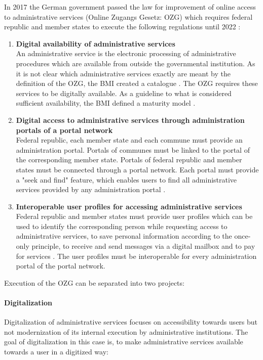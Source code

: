 In 2017 the German government passed the law for improvement of online access to administrative services (Online Zugangs Gesetz: OZG) which requires federal republic and member states to execute the following regulations until 2022 \cite{BMI:OZG_Wortlaut}:
\begin{enumerate}
    \item \textbf{Digital availability of administrative services} \\
    An administrative service is the electronic processing of administrative procedures which are available from outside the governmental institution.  As it is not clear which administrative services exactly are meant by the definition of the OZG, the BMI created a catalogue \cite{BMI:Verwaltungsleistungen}. The OZG requires these services to be digitally available. As a guideline to what is considered sufficient availability, the BMI defined a maturity model \cite{BMI:Digitale_Services}.
    \item \textbf{Digital access to administrative services through administration portals of a portal network} \\
    Federal republic, each member state and each commune must provide an administration portal. Portals of communes must be linked to the portal of the corresponding member state. Portals of federal republic and member states must be connected through a portal network. \cite{BMI:Portalverbund} Each portal must provide a "seek and find" feature, which enables users to find all administrative services provided by any administration portal \cite{Cotar:Drucksache_19/19089}. 
    \item \textbf{Interoperable user profiles for accessing administrative services} \\
    Federal republic and member states must provide user profiles which can be used to identify the corresponding person while requesting access to administrative services, to save personal information according to the once-only principle, to receive and send messages via a digital mailbox and to pay for services \cite{Cotar:Drucksache_19/19089}. The user profiles must be interoperable for every administration portal of the portal network.
\end{enumerate}

Execution of the OZG can be separated into two projects:

\paragraph{Digitalization}
Digitalization of administrative services focuses on accessibility towards users but not modernization of its internal execution by administrative institutions. The goal of digitalization in this case is, to make administrative services available towards a user in a digitized way:

